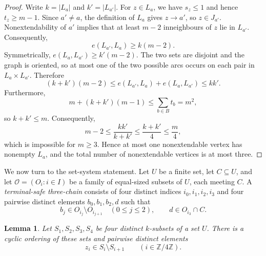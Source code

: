\documentclass[11pt]{amsart}
\newtheorem{lemma}[theorem]{Lemma}
\theoremstyle{definition}
\newcommand{\calO}{\mathcal O}
\begin{document}
\begin{proof}
Write $k=|L_a|$ and $k'=|L_{a'}|$.  For $z\in L_a$, we have $s_z\le1$ and hence $t_z\ge m-1$.  Since $a'\ne a$, the definition of $L_a$ gives $z\to a'$, so $z\in J_{a'}$.  Nonextendability of $a'$ implies that at least $m-2$ inneighbours of $z$ lie in $L_{a'}$.  Consequently,
\[
  e(L_{a'},L_a)\ge k(m-2).
\]
Symmetrically, $e(L_a,L_{a'})\ge k'(m-2)$.  The two sets are disjoint and the graph is oriented, so at most one of the two possible arcs occurs on each pair in $L_a\times L_{a'}$.  Therefore
\[
  (k+k')(m-2)
  \le e(L_{a'},L_a)+e(L_a,L_{a'})
  \le kk'.
\]
Furthermore,
\[
  m+(k+k')(m-1)\le\sum_{b\in B}t_b=m^2,
\]
so $k+k'\le m$.  Consequently,
\[
  m-2\le\frac{kk'}{k+k'}\le\frac{k+k'}4\le\frac m4,
\]
which is impossible for $m\ge3$.  Hence at most one nonextendable vertex has nonempty $L_a$, and the total number of nonextendable vertices is at most three.
\end{proof}

We now turn to the set-system statement.  Let $U$ be a finite set, let $C\subseteq U$, and let $\calO=(O_i:i\in I)$ be a family of equal-sized subsets of $U$, each meeting $C$.  A \emph{terminal-safe three-chain} consists of four distinct indices $i_0,i_1,i_2,i_3$ and four pairwise distinct elements $b_0,b_1,b_2,d$ such that
\[
  b_j\in O_{i_j}\setminus O_{i_{j+1}}\quad(0\le j\le2),
  \qquad d\in O_{i_3}\cap C.
\]

\begin{lemma}\label{lem:rainbow}
Let $S_1,S_2,S_3,S_4$ be four distinct $k$-subsets of a set $U$.
There is a cyclic ordering of these sets and pairwise distinct elements
\[
  z_i\in S_i\setminus S_{i+1}\qquad(i\in\mathbb Z/4\mathbb Z).
\]
\end{lemma}
\end{document}

